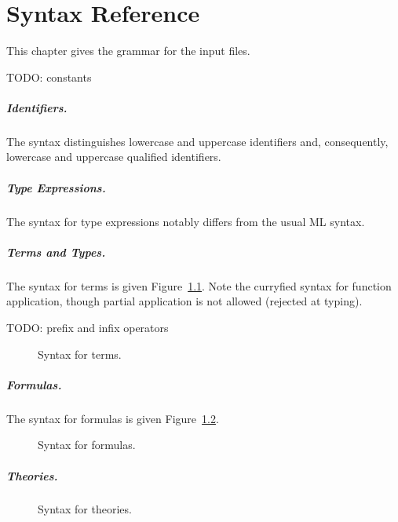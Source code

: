 \chapter{Syntax Reference}
\label{chap:syntaxref}

This chapter gives the grammar for the input files.

TODO: constants

\paragraph{Identifiers.} The syntax distinguishes lowercase and
uppercase identifiers and, consequently, lowercase and uppercase
qualified identifiers.
 
\begin{center}\framebox{}\end{center}

\paragraph{Type Expressions.} The syntax for type
expressions notably differs from the usual ML syntax.
\begin{center}\framebox{}\end{center}

\paragraph{Terms and Types.}
The syntax for terms is given Figure~\ref{fig:bnf:term}.
Note the curryfied syntax for function application, though partial
application is not allowed (rejected at typing).

TODO: prefix and infix operators

\begin{figure}
  \begin{center}\framebox{}\end{center}
  \caption{Syntax for terms.}
\label{fig:bnf:term}
\end{figure}

\paragraph{Formulas.}
The syntax for formulas is given Figure~\ref{fig:bnf:formula}.

\begin{figure}
  \begin{center}\framebox{}\end{center}
  \caption{Syntax for formulas.}
\label{fig:bnf:formula}
\end{figure}

\paragraph{Theories.}

\begin{figure}
  \begin{center}\framebox{}\end{center}
  \caption{Syntax for theories.}
\label{fig:bnf:theory}
\end{figure}

